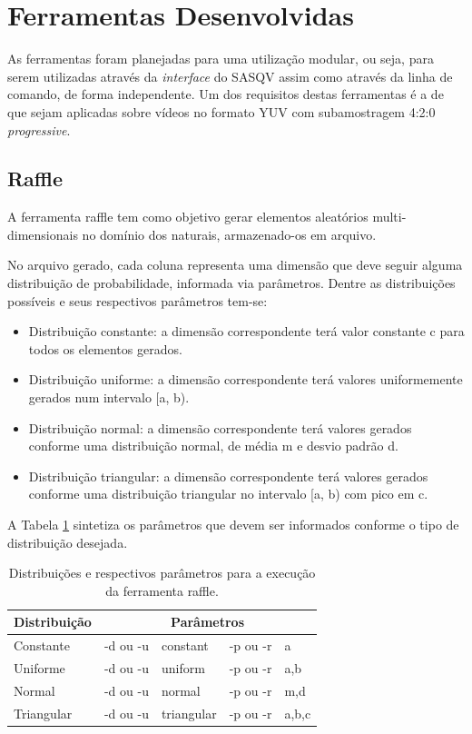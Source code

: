\section{Ferramentas Desenvolvidas}
\label{des:ferramentas}

As ferramentas foram planejadas para uma utilização modular, ou seja, para serem utilizadas através da \emph{interface} do SASQV assim como através da linha de comando, de forma independente. Um dos requisitos destas ferramentas é a de que sejam aplicadas sobre vídeos no formato YUV com subamostragem 4:2:0 \emph{progressive}.

\subsection{Raffle}
\label{des:raffle}

A ferramenta raffle tem como objetivo gerar elementos aleatórios multi-dimensionais no domínio dos naturais, armazenado-os em arquivo.

No arquivo gerado, cada coluna representa uma dimensão que deve seguir alguma distribuição de probabilidade, informada via parâmetros. Dentre as distribuições possíveis e seus respectivos parâmetros tem-se: 

\begin{itemize}
	\item Distribuição constante: a dimensão correspondente terá valor constante c para todos os elementos gerados.
	\item Distribuição uniforme: a dimensão correspondente terá valores uniformemente gerados num intervalo [a, b).
	\item Distribuição normal: a dimensão correspondente terá valores gerados conforme uma distribuição normal, de média m e desvio padrão d.
	\item Distribuição triangular: a dimensão correspondente terá valores gerados conforme uma distribuição triangular no intervalo [a, b) com pico em c.
\end{itemize}

A Tabela \ref{tab:distparam} sintetiza os parâmetros que devem ser informados conforme o tipo de distribuição desejada.

\begin{table}[!h]
	\centering
	\caption{Distribuições e respectivos parâmetros para a execução da ferramenta raffle.}
	\label{tab:distparam}
	\begin{tabular}{l|l|l|l|l}
		\hline
		Distribuição & \multicolumn{4}{c}{Parâmetros} \\
		\hline
		Constante  & -d ou -u & constant   & -p ou -r & a \\
		Uniforme   & -d ou -u & uniform	   & -p ou -r & a,b \\
		Normal     & -d ou -u & normal	   & -p ou -r & m,d \\
		Triangular & -d ou -u & triangular & -p ou -r & a,b,c \\
		\hline
	\end{tabular}
\end{table}

